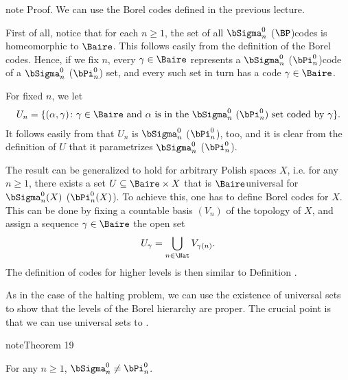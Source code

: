 \documentclass[letterpaper,10pt,english]{jupyterBook}
\begin{document}
\begin{sphinxadmonition}{note}
\sphinxAtStartPar
Proof. We can use the Borel codes defined in the previous lecture.

\sphinxAtStartPar
First of all, notice that for each \(n \geq 1\), the set of all \(\bSigma^0_n\) (\(\BP\))\sphinxhyphen{}codes is homeomorphic to \(\Baire\). This follows easily from the definition of the Borel codes. Hence, if we fix \(n\), every \(\gamma\in \Baire\) represents a \(\bSigma^0_n\) (\(\bPi^0_n\))\sphinxhyphen{}code of a \(\bSigma^0_n\) (\(\bPi^0_n\)) set, and every such set in turn has a code \(\gamma \in \Baire\).

\sphinxAtStartPar
For fixed \(n\), we let
\begin{equation*}
\begin{split}
    U_n = \{ (\alpha,\gamma) \colon \gamma \in \Baire \text{ and $\alpha$ is in the $\bSigma^0_n$ $(\bPi^0_n)$ set coded by $\gamma$}\}.
\end{split}
\end{equation*}
\sphinxAtStartPar
It follows easily from {\hyperref[\detokenize{codingBorel:thm-fundamental}]{}} that \(U_n\) is \(\bSigma^0_n\) (\(\bPi^0_n\)), too, and it is clear from the definition of \(U\) that it parametrizes \(\bSigma^0_n\) (\(\bPi^0_n\)).
\end{sphinxadmonition}

\sphinxAtStartPar
The result can be generalized to hold for arbitrary Polish spaces \(X\), i.e. for any \(n \geq 1\), there exists a set \(U \subseteq \Baire \times X\) that is \(\Baire\)\sphinxhyphen{}universal for \(\bSigma^0_n(X)\) (\(\bPi^0_n(X)\)). To achieve this, one has to define Borel codes for \(X\). This can be done by fixing a countable basis \((V_n)\) of the topology of \(X\), and assign a sequence \(\gamma \in \Baire\) the open set
\begin{equation*}
\begin{split}
	U_\gamma = \bigcup_{n \in \Nat} V_{\gamma(n)}.
\end{split}
\end{equation*}
\sphinxAtStartPar
The definition of codes for higher levels is then similar to Definition {\hyperref[\detokenize{codingBorel:def-Borel-codes}]{}}.

\sphinxAtStartPar
As in the case of the halting problem, we can use the existence of universal sets to show that the levels of the Borel hierarchy are proper. The crucial point is that we can use universal sets to .
\label{structureBorel:thm-Borel-proper}
\begin{sphinxadmonition}{note}{Theorem 19}



\sphinxAtStartPar
For any \(n \geq 1\), \(\bSigma^0_n \neq \bPi^0_n\).
\end{sphinxadmonition}
\end{document}
